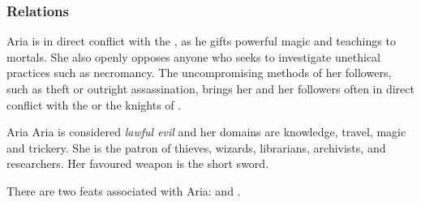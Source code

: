 \subsubsection{Relations}

Aria is in direct conflict with the , as he gifts
powerful magic and teachings to mortals. She also openly opposes anyone who
seeks to investigate unethical practices such as necromancy. The
uncompromising methods of her followers, such as theft or outright
assassination, brings her and her followers often in direct conflict with the
 or the knights of .

\begin{35e}{Aria}
  Aria is considered \emph{lawful evil} and her domains are knowledge, travel,
  magic and trickery. She is the patron of thieves, wizards, librarians,
  archivists, and researchers. Her favoured weapon is the short sword.

  There are two feats associated with Aria:  and
  .
\end{35e}
